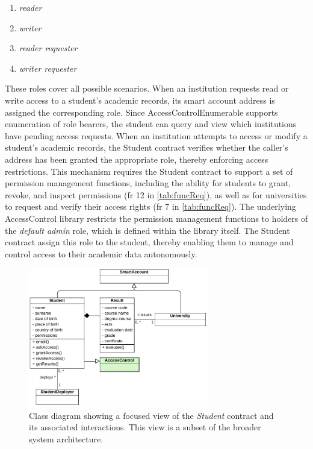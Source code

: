 \begin{enumerate}
    \item \textit{reader}
    \item \textit{writer}
    \item \textit{reader requester}
    \item \textit{writer requester}
\end{enumerate}
These roles cover all possible scenarios. When an institution requests read or write access to a student's academic records,  its smart account address is assigned the corresponding role. Since AccessControlEnumerable supports enumeration of role bearers, the student can query and view which institutions have pending access requests. 
When an institution attempts to access or modify a student's academic records, the Student contract verifies whether the caller's address has been granted the appropriate role, thereby enforcing access restrictions. This mechanism requires the Student contract to support a set of permission management functions, including the ability for students to grant, revoke, and inspect permissions (\acrshort{fr} 12 in \cref{tab:funcReq}), as well as for universities to request and verify their access rights (\acrshort{fr} 7 in \cref{tab:funcReq}).
The underlying AccessControl library restricts the permission management functions to holders of the \textit{default admin} role, which is defined within the library itself. The Student contract assign this role to the student, thereby enabling them to manage and control access to their academic data autonomously. 
\begin{figure}
  \centering
  \includegraphics[width=0.7\textwidth]{figures/Student class diagram.pdf}
  \caption[Class diagram focused on \textit{Student} contract]{Class diagram showing a focused view of the \textit{Student} contract and its associated interactions. This view is a subset of the broader system architecture.}
  \label{fig:studentContractClass}
\end{figure}

